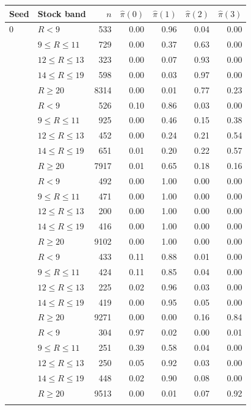 \begin{tabular}{llrrrrr}
\toprule
Seed & Stock band & $n$ & $\hat\pi(0)$ & $\hat\pi(1)$ & $\hat\pi(2)$ & $\hat\pi(3)$ \\
\midrule
0 & $R<9$ & 533 & 0.00 & 0.96 & 0.04 & 0.00 \\
 & $9\le R\le 11$ & 729 & 0.00 & 0.37 & 0.63 & 0.00 \\
 & $12\le R\le 13$ & 323 & 0.00 & 0.07 & 0.93 & 0.00 \\
 & $14\le R\le 19$ & 598 & 0.00 & 0.03 & 0.97 & 0.00 \\
 & $R\ge 20$ & 8314 & 0.00 & 0.01 & 0.77 & 0.23 \\
\addlinespace
1 & $R<9$ & 526 & 0.10 & 0.86 & 0.03 & 0.00 \\
 & $9\le R\le 11$ & 925 & 0.00 & 0.46 & 0.15 & 0.38 \\
 & $12\le R\le 13$ & 452 & 0.00 & 0.24 & 0.21 & 0.54 \\
 & $14\le R\le 19$ & 651 & 0.01 & 0.20 & 0.22 & 0.57 \\
 & $R\ge 20$ & 7917 & 0.01 & 0.65 & 0.18 & 0.16 \\
\addlinespace
2 & $R<9$ & 492 & 0.00 & 1.00 & 0.00 & 0.00 \\
 & $9\le R\le 11$ & 471 & 0.00 & 1.00 & 0.00 & 0.00 \\
 & $12\le R\le 13$ & 200 & 0.00 & 1.00 & 0.00 & 0.00 \\
 & $14\le R\le 19$ & 416 & 0.00 & 1.00 & 0.00 & 0.00 \\
 & $R\ge 20$ & 9102 & 0.00 & 1.00 & 0.00 & 0.00 \\
\addlinespace
3 & $R<9$ & 433 & 0.11 & 0.88 & 0.01 & 0.00 \\
 & $9\le R\le 11$ & 424 & 0.11 & 0.85 & 0.04 & 0.00 \\
 & $12\le R\le 13$ & 225 & 0.02 & 0.96 & 0.03 & 0.00 \\
 & $14\le R\le 19$ & 419 & 0.00 & 0.95 & 0.05 & 0.00 \\
 & $R\ge 20$ & 9271 & 0.00 & 0.00 & 0.16 & 0.84 \\
\addlinespace
4 & $R<9$ & 304 & 0.97 & 0.02 & 0.00 & 0.01 \\
 & $9\le R\le 11$ & 251 & 0.39 & 0.58 & 0.04 & 0.00 \\
 & $12\le R\le 13$ & 250 & 0.05 & 0.92 & 0.03 & 0.00 \\
 & $14\le R\le 19$ & 448 & 0.02 & 0.90 & 0.08 & 0.00 \\
 & $R\ge 20$ & 9513 & 0.00 & 0.01 & 0.07 & 0.92 \\
\addlinespace
\bottomrule
\end{tabular}
